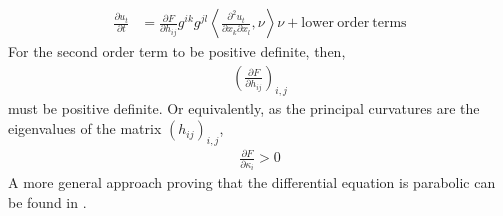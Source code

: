 %
\begin{align*}
	\frac{\partial u_t}{\partial t} &= \frac{\partial F}{\partial h_{i j}} g^{i k}g^{jl}\left\langle \frac{\partial^2 u_t}{\partial x_k\partial x_l} , \nu \right\rangle \nu+ \mathrm{lower \ order \ terms}
\end{align*}
For the second order term to be positive definite, then, 
\begin{align*}
	\left(\frac{\partial F}{\partial h_{i j}} \right)_{i, j}
\end{align*}
must be positive definite. Or equivalently, as the principal curvatures are the eigenvalues of the matrix $(h_{i j})_{i, j}$,
\begin{align*}
	\frac{\partial F}{\partial \kappa_{i}} > 0
\end{align*}
A more general approach proving that the differential equation is parabolic can be found in \cite{Gerhardt Curvature}. 
\begin{comment}
	{\em Looking more closely at what we are doing, one can prove that it is equivalent to follow this linearisation procedure or to take the derivatives of $F$ with respect to the second order terms.}
\end{comment}

